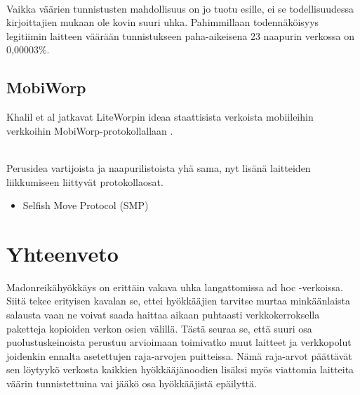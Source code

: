 \documentclass[finnish]{tktltiki2}
\theoremstyle{definition}
\theoremstyle{remark}
\begin{document}
\noindent \\
Vaikka väärien tunnistusten mahdollisuus on jo tuotu esille, ei se todellisuudessa kirjoittajien mukaan ole kovin suuri uhka. Pahimmillaan todennäköisyys legitiimin laitteen väärään tunnistukseen paha-aikeisena 23 naapurin verkossa on 0,00003\%.

\subsection{MobiWorp}

Khalil et al jatkavat LiteWorpin ideaa staattisista verkoista mobiileihin verkkoihin MobiWorp-protokollallaan \cite{mobiworp}.

\noindent \\
Perusidea vartijoista ja naapurilistoista yhä sama, nyt lisänä laitteiden liikkumiseen liittyvät protokollaosat.

\begin{itemize}
\item Selfish Move Protocol (SMP)

\end{itemize}

\section{Yhteenveto}

Madonreikähyökkäys on erittäin vakava uhka langattomissa ad hoc -verkoissa. Siitä tekee erityisen kavalan se, ettei hyökkääjien tarvitse murtaa minkäänlaista salausta vaan ne voivat saada haittaa aikaan puhtaasti verkkokerroksella paketteja kopioiden verkon osien välillä. Tästä seuraa se, että suuri osa puolustuskeinoista perustuu arvioimaan toimivatko muut laitteet ja verkkopolut joidenkin ennalta asetettujen raja-arvojen puitteissa. Nämä raja-arvot päättävät sen löytyykö verkosta kaikkien hyökkääjänoodien lisäksi myös viattomia laitteita väärin tunnistettuina vai jääkö osa hyökkääjistä epäilyttä.




%
%
%
\newpage

%






% 
\end{document}
